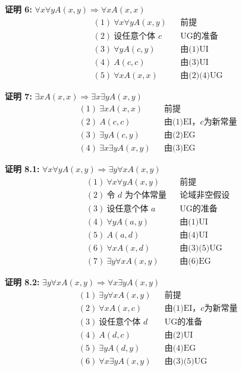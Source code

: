 \noindent
\textbf{证明 6:} $\forall x\forall yA(x,y)\Rightarrow \forall xA(x,x)$
\vspace{-10pt}
\begin{align*}
&(1)\ \forall x\forall yA(x,y) && \text{前提} \\
&(2)\ \text{设任意个体 $c$} && \text{UG的准备} \\
&(3)\ \forall yA(c,y) && \text{由(1)UI} \\
&(4)\ A(c,c) && \text{由(3)UI} \\
&(5)\ \forall xA(x,x) && \text{由(2)(4)UG}
\end{align*}

\noindent
\textbf{证明 7:} $\exists xA(x,x)\Rightarrow \exists x\exists yA(x,y)$
\vspace{-10pt}
\begin{align*}
&(1)\ \exists xA(x,x) && \text{前提} \\
&(2)\ A(c,c) && \text{由(1)EI，$c$为新常量} \\
&(3)\ \exists yA(c,y) && \text{由(2)EG} \\
&(4)\ \exists x\exists yA(x,y) && \text{由(3)EG}
\end{align*}

\noindent
\textbf{证明 8.1:} $\forall x\forall yA(x,y)\Rightarrow \exists y\forall xA(x,y)$
\vspace{-10pt}
\begin{align*}
&(1)\ \forall x\forall yA(x,y) && \text{前提} \\
&(2)\ \text{令 $d$ 为个体常量} && \text{论域非空假设} \\
&(3)\ \text{设任意个体 $a$} && \text{UG的准备} \\
&(4)\ \forall yA(a,y) && \text{由(1)UI} \\
&(5)\ A(a,d) && \text{由(4)UI} \\
&(6)\ \forall xA(x,d) && \text{由(3)(5)UG} \\
&(7)\ \exists y\forall xA(x,y) && \text{由(6)EG}
\end{align*}

\noindent
\textbf{证明 8.2:} $\exists y\forall xA(x,y)\Rightarrow \forall x\exists yA(x,y)$
\vspace{-10pt}
\begin{align*}
&(1)\ \exists y\forall xA(x,y) && \text{前提} \\
&(2)\ \forall xA(x,c) && \text{由(1)EI，$c$为新常量} \\
&(3)\ \text{设任意个体 $d$} && \text{UG的准备} \\
&(4)\ A(d,c) && \text{由(2)UI} \\
&(5)\ \exists yA(d,y) && \text{由(4)EG} \\
&(6)\ \forall x\exists yA(x,y) && \text{由(3)(5)UG}
\end{align*}

